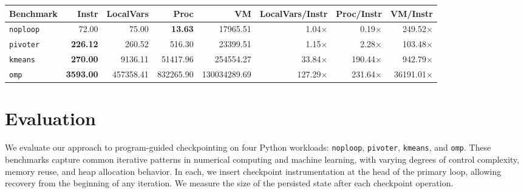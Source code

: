 

\newcommand{\VMDIFF}[0]{{\textDelta VM}}
\newcommand{\PROCDIFF}[0]{{\textDelta Proc}}


\begin{table*}
\centering
\begin{tabular}{lrrrr|rrr}
\toprule
\textbf{Benchmark} & \textbf{Instr} & \textbf{LocalVars} & \textbf{\PROCDIFF} & \textbf{\VMDIFF} & \textbf{LocalVars/Instr} & \textbf{\PROCDIFF/Instr} & \textbf{\VMDIFF/Instr} \\
\midrule
\texttt{noploop} & 72.00 & 75.00         & \textbf{13.63} & 17965.51
                         & 1.04$\times$  & 0.19$\times$   & 249.52$\times$ \\
\texttt{pivoter} &\textbf{226.12} & 260.52       & 516.30        & 23399.51
                                  & 1.15$\times$ & 2.28$\times$  & 103.48$\times$ \\
\texttt{kmeans} & \textbf{270.00} & 9136.11       & 51417.96       & 254554.27
                                  & 33.84$\times$ & 190.44$\times$ & 942.79$\times$  \\
\texttt{omp} & \textbf{3593.00} & 457358.41      & 832265.90      & 130034289.69 
                                & 127.29$\times$ & 231.64$\times$ &	36191.01$\times$  \\
\bottomrule
\end{tabular}
\caption{Average checkpoint sizes (in bytes) across filtered iterations. "Instr" refers to the instrumented version produced by our static analysis-based checkpointing. "\PROCDIFF" and "\VMDIFF" refer to memory diffs at the process and virtual machine levels respectively.}
\label{tab:checkpoint-sizes}
\end{table*}

\begin{figure*}
    \centering
    
\end{figure*}

\section{Evaluation}
\label{sec:evaluation}
We evaluate our approach to program-guided checkpointing on four Python workloads: \texttt{noploop}, \texttt{pivoter}, \texttt{kmeans}, and \texttt{omp}. These benchmarks capture common iterative patterns in numerical computing and machine learning, with varying degrees of control complexity, memory reuse, and heap allocation behavior. In each, we insert checkpoint instrumentation at the head of the primary loop, allowing recovery from the beginning of any iteration. We measure the size of the persisted state after each checkpoint operation.

